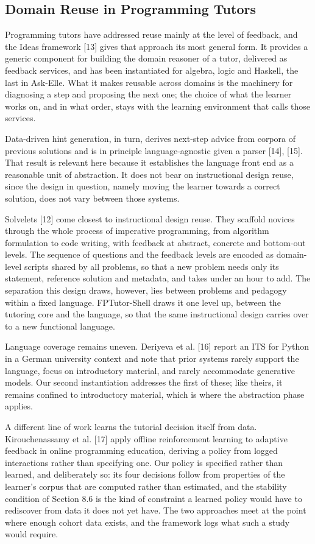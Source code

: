 \documentclass[10pt,twocolumn,letterpaper]{article}
\begin{document}
\subsection{Domain Reuse in Programming Tutors}
Programming tutors have addressed reuse mainly at the level of feedback, and the Ideas framework [13] gives that approach its most general form. It provides a generic component for building the domain reasoner of a tutor, delivered as feedback services, and has been instantiated for algebra, logic and Haskell, the last in Ask-Elle. What it makes reusable across domains is the machinery for diagnosing a step and proposing the next one; the choice of what the learner works on, and in what order, stays with the learning environment that calls those services.

Data-driven hint generation, in turn, derives next-step advice from corpora of
previous solutions and is in principle language-agnostic given a parser
[14], [15]. That result is relevant here because it establishes
the language front end as a reasonable unit of abstraction. It does not
bear on instructional design reuse, since the design in question, namely
moving the learner towards a correct solution, does not vary between
those systems.

Solvelets [12] come closest to instructional design reuse. They scaffold novices through the whole process of imperative programming, from algorithm formulation to code writing, with feedback at abstract, concrete and bottom-out levels. The sequence of questions and the feedback levels are encoded as domain-level scripts shared by all problems, so that a new problem needs only its statement, reference solution and metadata, and takes under an hour to add. The separation this design draws, however, lies between problems and pedagogy within a fixed language. FPTutor-Shell draws it one level up, between the tutoring core and the language, so that the same instructional design carries over to a new functional language.

Language coverage remains uneven. Deriyeva et al. [16] report an ITS for
Python in a German university context and note that prior systems rarely
support the language, focus on introductory material, and rarely accommodate
generative models. Our second instantiation addresses the first of these; like theirs, it remains confined to introductory material, which is where the abstraction phase applies.

A different line of work learns the tutorial decision itself from data.
Kirouchenassamy et al. [17] apply offline reinforcement learning to
adaptive feedback in online programming education, deriving a policy from
logged interactions rather than specifying one. Our policy is specified
rather than learned, and deliberately so: its four decisions follow from
properties of the learner's corpus that are computed rather than
estimated, and the stability condition of Section 8.6 is the kind of
constraint a learned policy would have to rediscover from data it does not
yet have. The two approaches meet at the point where enough cohort data
exists, and the framework logs what such a study would require.
\end{document}
